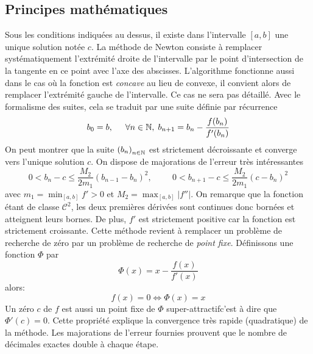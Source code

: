 \subsection{Principes mathématiques}
Sous les conditions indiquées au dessus, il existe dans l'intervalle $[a,b]$ une unique solution notée $c$. La méthode de Newton consiste à remplacer systématiquement l'extrémité droite de l'intervalle par le point d'intersection de la tangente en ce point avec l'axe des abscisses. L'algorithme fonctionne aussi dans le cas où la fonction est \emph{concave} au lieu de convexe, il convient alors de remplacer l'extrémité gauche de l'intervalle. Ce cas ne sera pas détaillé.\newline
Avec le formalisme des suites, cela se traduit par une suite définie par récurrence
\begin{displaymath}
  b_0 = b,\hspace{0.5cm}\forall n\in\mathbb{N},\;b_{n+1} = b_n -\frac{f(b_n)}{f'(b_n)}
\end{displaymath}
On peut montrer que la suite $\left( b_n\right)_{n\in \mathbb{N}}$ est strictement décroissante et converge vers l'unique solution $c$. On dispose de majorations de l'erreur très intéressantes
\begin{displaymath}
  0< b_n -c \leq \frac{M_2}{2m_1}(b_{n-1}-b_n)^2,\hspace{1cm} 0< b_{n+1} -c \leq \frac{M_2}{2m_1}(c-b_n)^2
\end{displaymath}
avec $m_1 = \min_{[a,b]} f'>0$ et $M_2 = \max_{[a,b]}\left|f''\right|$.\newline
On remarque que la fonction étant de classe $\mathcal{C}^2$, les deux premières dérivées sont continues donc bornées et atteignent leurs bornes. De plus, $f'$ est strictement positive car la fonction est strictement croissante.\newline
Cette méthode revient à remplacer un problème de recherche de zéro par un problème de recherche de \emph{point fixe}. Définissons une fonction $\Phi$ par
\begin{displaymath}
  \Phi(x) = x -\frac{f(x)}{f'(x)}
\end{displaymath}
alors:
\begin{displaymath}
  f(x) = 0 \Leftrightarrow \Phi(x) = x
\end{displaymath}
Un zéro $c$ de $f$ est aussi un point fixe de $\Phi$ \og super-attractif\fg c'est à dire que $\Phi'(c)=0$. Cette propriété explique la convergence très rapide (quadratique) de la méthode. Les majorations de l'erreur fournies prouvent que le nombre de décimales exactes double à chaque étape.

